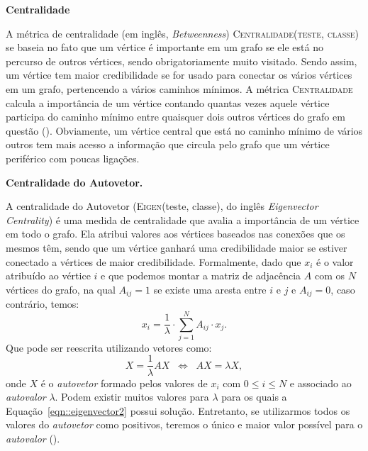 \begin{description}
\item{\textbf{Centralidade}}
\label{item::constraint}

A métrica de centralidade (em inglês, \textit{Betweenness}) \textsc{Centralidade(teste, classe)} se baseia no fato que um vértice é importante em um grafo se ele está no percurso de outros vértices, sendo obrigatoriamente muito visitado. Sendo assim, um vértice tem maior credibilidade se for usado para conectar os vários vértices em um grafo, pertencendo a vários caminhos mínimos.
A métrica \textsc{Centralidade} calcula a importância de um vértice contando quantas vezes aquele vértice participa do caminho mínimo entre quaisquer dois outros vértices do grafo em questão (\cite{Sabidussi66}). Obviamente, um vértice central que está no caminho mínimo de vários outros tem mais acesso a informação que circula pelo grafo que um vértice periférico com poucas ligações.

\item{\textbf{Centralidade do Autovetor.}}
\label{item::eigenvector}

A centralidade do Autovetor (\textsc{Eigen}(teste, classe), do inglês \textit{Eigenvector Centrality}) é uma medida de centralidade que avalia a importância de um vértice em todo o grafo. Ela atribui valores aos vértices baseados nas conexões que os mesmos têm, sendo que um vértice ganhará uma credibilidade maior se estiver conectado a vértices de maior credibilidade. Formalmente, dado que $x_i$ é o valor atribuído ao vértice $i$ e que podemos montar a matriz de adjacência $A$ com os $N$ vértices do grafo, na qual $A_{ij} = 1$ se existe uma aresta entre $i$ e $j$ e $A_{ij}=0$, caso contrário, temos:
\begin{equation}\label{eqn::eigenvector1}
   x_i = \frac{1}{\lambda} \cdot \sum\limits_{j=1}^{N} A_{ij} \cdot x_j.
\end{equation}
Que pode ser reescrita utilizando vetores como:
\begin{equation}\label{eqn::eigenvector2}
   X = \frac{1}{\lambda} AX  \;\; \Longleftrightarrow\;\;  AX = \lambda X,
\end{equation}
onde $X$ é o \textit{autovetor} formado pelos valores de $x_i$ com $0 \leq i \leq N$ e associado ao \textit{autovalor} $\lambda$. Podem existir muitos valores para $\lambda$ para os quais a Equação~\ref{eqn::eigenvector2} possui solução. Entretanto, se utilizarmos todos os valores do \textit{autovetor} como positivos, teremos o único e maior valor possível para o \textit{autovalor} (\cite{Newman10}).


\end{description}
